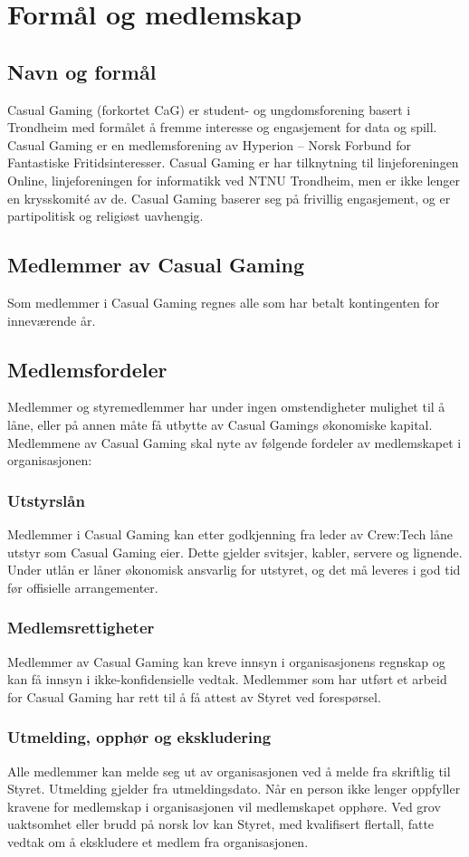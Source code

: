 \chapter{Formål og medlemskap}

\section{Navn og formål}
Casual Gaming (forkortet CaG) er student- og ungdomsforening basert i Trondheim med formålet å fremme interesse og engasjement for data og spill. Casual Gaming er en medlemsforening av Hyperion – Norsk Forbund for Fantastiske Fritidsinteresser. Casual Gaming er har tilknytning til linjeforeningen Online, linjeforeningen for informatikk ved NTNU Trondheim, men er ikke lenger en krysskomité av de. Casual Gaming baserer seg på frivillig engasjement, og er partipolitisk og religiøst uavhengig.

\section{Medlemmer av Casual Gaming}
Som medlemmer i Casual Gaming regnes alle som har betalt kontingenten for inneværende år.

\section{Medlemsfordeler}
Medlemmer og styremedlemmer har under ingen omstendigheter mulighet til å låne, eller på annen måte få utbytte av Casual Gamings økonomiske kapital. Medlemmene av Casual Gaming skal nyte av følgende fordeler av medlemskapet i organisasjonen:

\subsection{Utstyrslån}
Medlemmer i Casual Gaming kan etter godkjenning fra leder av Crew:Tech låne utstyr som Casual Gaming eier. Dette gjelder svitsjer, kabler, servere og lignende. Under utlån er låner økonomisk ansvarlig for utstyret, og det må leveres i god tid før offisielle arrangementer.

\subsection{Medlemsrettigheter}
Medlemmer av Casual Gaming kan kreve innsyn i organisasjonens regnskap og kan få innsyn i ikke-konfidensielle vedtak. Medlemmer som har utført et arbeid for Casual Gaming har rett til å få attest av Styret ved forespørsel.

\subsection{Utmelding, opphør og ekskludering}
Alle medlemmer kan melde seg ut av organisasjonen ved å melde fra skriftlig til Styret. Utmelding gjelder fra utmeldingsdato. Når en person ikke lenger oppfyller kravene for medlemskap i organisasjonen vil medlemskapet opphøre. Ved grov uaktsomhet eller brudd på norsk lov kan Styret, med kvalifisert flertall, fatte vedtak om å ekskludere et medlem fra organisasjonen.
